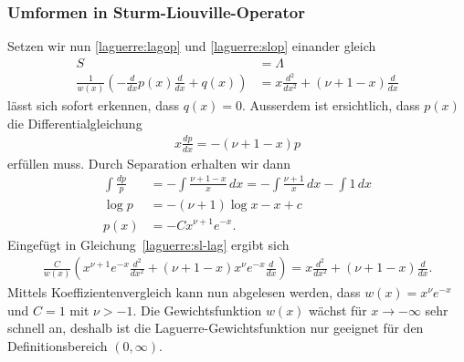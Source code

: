 
\subsubsection{Umformen in Sturm-Liouville-Operator}
Setzen wir nun 
\eqref{laguerre:lagop} und \eqref{laguerre:slop}
einander gleich
\begin{align}
S
 & =
\Lambda
\nonumber
\\
\frac{1}{w(x)} \left(-\frac{d}{dx}p(x) \frac{d}{dx} + q(x) \right)
 & =
x \frac{d^2}{dx^2} + (\nu + 1 - x) \frac{d}{dx}
\label{laguerre:sl-lag}
\end{align}
lässt sich sofort erkennen, dass $q(x) = 0$.
Ausserdem ist ersichtlich, dass $p(x)$ die Differentialgleichung
\begin{align*}
x \frac{dp}{dx}
=
-(\nu + 1 - x) p
\end{align*}
erfüllen muss.
Durch Separation erhalten wir dann
\begin{align*}
\int \frac{dp}{p}
 & =
-\int \frac{\nu + 1 - x}{x} \, dx
=
-\int \frac{\nu + 1}{x} \, dx - \int 1\, dx
\\
\log p
 & =
-(\nu + 1)\log x - x + c
\\
p(x)
 & =
-C x^{\nu + 1} e^{-x}
.
\end{align*}
Eingefügt in Gleichung~\eqref{laguerre:sl-lag} ergibt sich
\begin{align*}
\frac{C}{w(x)}
\left(
x^{\nu+1} e^{-x} \frac{d^2}{dx^2} +
(\nu + 1 - x) x^{\nu} e^{-x} \frac{d}{dx}
\right)
=
x \frac{d^2}{dx^2} + (\nu + 1 - x) \frac{d}{dx}.
\end{align*}
Mittels Koeffizientenvergleich kann nun abgelesen werden,
dass $w(x) = x^\nu e^{-x}$ und $C=1$ mit $\nu > -1$.
Die Gewichtsfunktion $w(x)$ wächst für $x\rightarrow-\infty$ sehr schnell an,
deshalb ist die Laguerre-Gewichtsfunktion nur geeignet für den
Definitionsbereich $(0, \infty)$.

